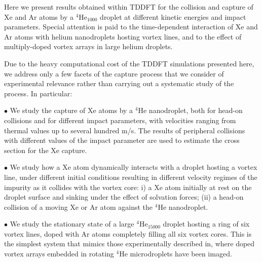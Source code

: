 Here we present results obtained within TDDFT 
for the collision and capture of Xe and Ar atoms by a $^4$He$_{1000}$ 
droplet at different kinetic energies and impact parameters. Special attention is paid 
to the  time-dependent interaction of Xe and Ar atoms with 
helium nanodroplets hosting 
vortex lines, and to the effect of multiply-doped vortex arrays in large helium droplets.

Due to the heavy computational cost 
of the TDDFT simulations presented here, 
we  address only a few facets of the capture 
process that we consider of experimental relevance
rather than carrying out a systematic study of the process. In particular:

$\bullet$ We study the capture of Xe atoms by a $^4$He nanodroplet, both for head-on 
collisions and for different impact parameters,
with velocities ranging from thermal values up to several hundred m/s.
The results of peripheral collisions  
with different values of the impact parameter 
are used to estimate the cross section for the
Xe capture.
 
$\bullet$ We study how a Xe atom dynamically interacts with a 
droplet hosting a vortex line, under different initial conditions
resulting in different velocity regimes of the impurity as it 
collides with the vortex core:
i) a Xe atom initially at rest on the droplet surface and
sinking under the effect of solvation forces;
(ii) a head-on collision of a moving Xe or Ar atom  against the
$^4$He nanodroplet.

$\bullet$ We study the stationary state of 
a large $^4$He$_{15000}$ 
droplet hosting a ring of six vortex lines, doped with 
Ar atoms completely filling all six vortex cores. This is the simplest system that mimics those
experimentally described in, where 
doped vortex arrays embedded in rotating $^4$He microdroplets have been imaged.
 


